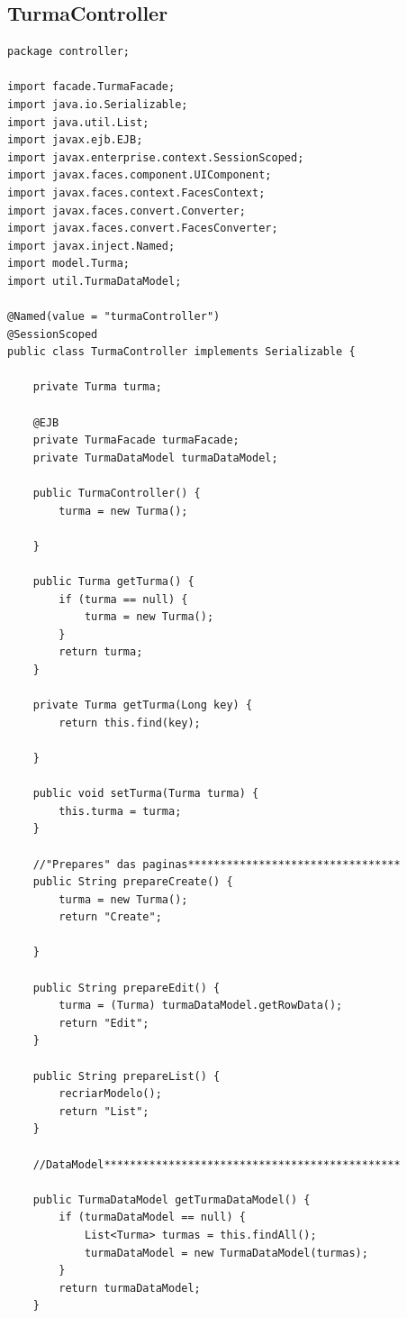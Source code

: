 \documentclass[12pt,a4paper]{article}
\begin{document}
\subsection{TurmaController}
\label{subsectionTurmaController}
\begin{lstlisting}
package controller;

import facade.TurmaFacade;
import java.io.Serializable;
import java.util.List;
import javax.ejb.EJB;
import javax.enterprise.context.SessionScoped;
import javax.faces.component.UIComponent;
import javax.faces.context.FacesContext;
import javax.faces.convert.Converter;
import javax.faces.convert.FacesConverter;
import javax.inject.Named;
import model.Turma;
import util.TurmaDataModel;

@Named(value = "turmaController")
@SessionScoped
public class TurmaController implements Serializable {

    private Turma turma;

    @EJB
    private TurmaFacade turmaFacade;
    private TurmaDataModel turmaDataModel;

    public TurmaController() {
        turma = new Turma();

    }

    public Turma getTurma() {
        if (turma == null) {
            turma = new Turma();
        }
        return turma;
    }

    private Turma getTurma(Long key) {
        return this.find(key);

    }

    public void setTurma(Turma turma) {
        this.turma = turma;
    }

    //"Prepares" das paginas*********************************
    public String prepareCreate() {
        turma = new Turma();
        return "Create";

    }

    public String prepareEdit() {
        turma = (Turma) turmaDataModel.getRowData();
        return "Edit";
    }

    public String prepareList() {
        recriarModelo();
        return "List";
    }

    //DataModel**********************************************
    
    public TurmaDataModel getTurmaDataModel() {
        if (turmaDataModel == null) {
            List<Turma> turmas = this.findAll();
            turmaDataModel = new TurmaDataModel(turmas);
        }
        return turmaDataModel;
    }


\end{lstlisting}
\end{document}
